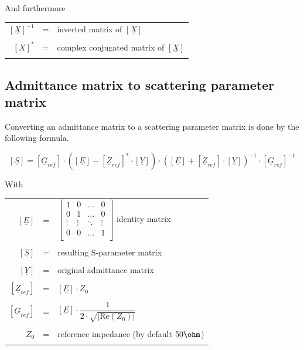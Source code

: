 \documentclass[10pt]{report}
\begin{document}
And furthermore

\addvspace{12pt}

\begin{tabular}{rll}
$\left[\underline{X}\right]^{-1}$ & = &
inverted matrix of $\left[\underline{X}\right]$\\& &\\
$\left[\underline{X}\right]^{*}$ & = & 
complex conjugated matrix of $\left[\underline{X}\right]$\\& &\\
\end{tabular}

\subsection{Admittance matrix to scattering parameter matrix}

Converting an admittance matrix to a scattering parameter matrix is
done by the following formula.

\begin{equation}
\left[
\underline{S}
\right]
=
\left[
\underline{G}_{ref}
\right]
\cdot
\left(
\left[\underline{E}\right] - \left[\underline{Z}_{ref}\right]^{*} \cdot \left[\underline{Y}\right]
\right)
\cdot
\left(
\left[\underline{E}\right] + \left[\underline{Z}_{ref}\right] \cdot \left[\underline{Y}\right]
\right)^{-1}
\cdot
\left[\underline{G}_{ref}\right]^{-1}
\end{equation}

With

\addvspace{12pt}

\begin{tabular}{rll}
$\left[\underline{E}\right]$ & = &
$\begin{bmatrix}
1 & 0 & \ldots & 0\\
0 & 1 & \ldots & 0\\
\vdots & \vdots & \ddots & \vdots\\
0 & 0 & \ldots & 1\\
\end{bmatrix}$
identity matrix\\& &\\
$\left[\underline{S}\right]$ & = & resulting S-parameter matrix\\& &\\
$\left[\underline{Y}\right]$ & = & original admittance matrix\\& &\\
$\left[\underline{Z}_{ref}\right]$ & = &
$\left[\underline{E}\right] \cdot Z_{0}$\\& &\\
$\left[\underline{G}_{ref}\right]$ & = &
$\left[\underline{E}\right] \cdot 
\dfrac{1}{2\cdot \sqrt{\left| \text{Re}\left(Z_{0}\right)\right|}}$\\& &\\
$Z_{0}$ & = & reference impedance (by default $50\ohm$)\\& &\\
\end{tabular}
\end{document}
